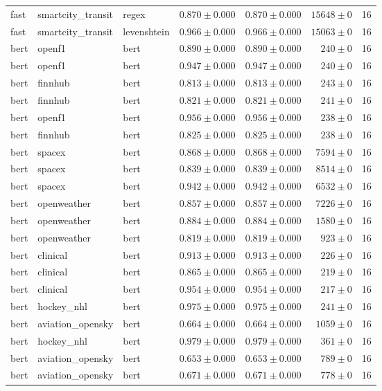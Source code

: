 \begin{table}[htbp]
\begin{tabular}{l l l r r r r}
fast & smartcity\_transit & regex & $0.870\pm0.000$ & $0.870\pm0.000$ & $15648\pm0$ & 16 \\
fast & smartcity\_transit & levenshtein & $0.966\pm0.000$ & $0.966\pm0.000$ & $15063\pm0$ & 16 \\
bert & openf1 & bert & $0.890\pm0.000$ & $0.890\pm0.000$ & $240\pm0$ & 16 \\
bert & openf1 & bert & $0.947\pm0.000$ & $0.947\pm0.000$ & $240\pm0$ & 16 \\
bert & finnhub & bert & $0.813\pm0.000$ & $0.813\pm0.000$ & $243\pm0$ & 16 \\
bert & finnhub & bert & $0.821\pm0.000$ & $0.821\pm0.000$ & $241\pm0$ & 16 \\
bert & openf1 & bert & $0.956\pm0.000$ & $0.956\pm0.000$ & $238\pm0$ & 16 \\
bert & finnhub & bert & $0.825\pm0.000$ & $0.825\pm0.000$ & $238\pm0$ & 16 \\
bert & spacex & bert & $0.868\pm0.000$ & $0.868\pm0.000$ & $7594\pm0$ & 16 \\
bert & spacex & bert & $0.839\pm0.000$ & $0.839\pm0.000$ & $8514\pm0$ & 16 \\
bert & spacex & bert & $0.942\pm0.000$ & $0.942\pm0.000$ & $6532\pm0$ & 16 \\
bert & openweather & bert & $0.857\pm0.000$ & $0.857\pm0.000$ & $7226\pm0$ & 16 \\
bert & openweather & bert & $0.884\pm0.000$ & $0.884\pm0.000$ & $1580\pm0$ & 16 \\
bert & openweather & bert & $0.819\pm0.000$ & $0.819\pm0.000$ & $923\pm0$ & 16 \\
bert & clinical & bert & $0.913\pm0.000$ & $0.913\pm0.000$ & $226\pm0$ & 16 \\
bert & clinical & bert & $0.865\pm0.000$ & $0.865\pm0.000$ & $219\pm0$ & 16 \\
bert & clinical & bert & $0.954\pm0.000$ & $0.954\pm0.000$ & $217\pm0$ & 16 \\
bert & hockey\_nhl & bert & $0.975\pm0.000$ & $0.975\pm0.000$ & $241\pm0$ & 16 \\
bert & aviation\_opensky & bert & $0.664\pm0.000$ & $0.664\pm0.000$ & $1059\pm0$ & 16 \\
bert & hockey\_nhl & bert & $0.979\pm0.000$ & $0.979\pm0.000$ & $361\pm0$ & 16 \\
bert & aviation\_opensky & bert & $0.653\pm0.000$ & $0.653\pm0.000$ & $789\pm0$ & 16 \\
bert & aviation\_opensky & bert & $0.671\pm0.000$ & $0.671\pm0.000$ & $778\pm0$ & 16 \\

\end{tabular}
\end{table}
